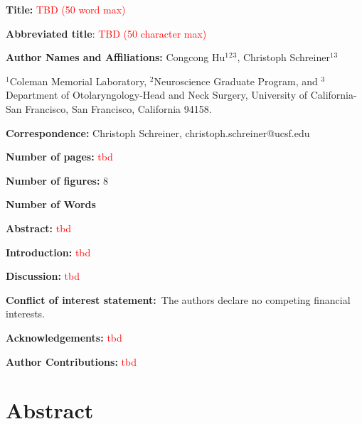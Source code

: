 \documentclass[11pt]{article}
\begin{document}
\begingroup
\let\center\flushleft
\let\endcenter\endflushleft
\endgroup

\doublespacing

\sloppy

\textbf{Title:} \textcolor{red}{TBD (50 word max)}

\textbf{Abbreviated title}: \textcolor{red}{TBD (50 character max)}

\textbf{Author Names and Affiliations:} Congcong Hu\(^1\)\(^2\)\(^3\), Christoph Schreiner\(^1\)\(^3\)

\(^1\)Coleman Memorial Laboratory, \(^2\)Neuroscience Graduate Program, and \(^3\)Department of Otolaryngology-Head and Neck Surgery, University of California-San Francisco, San Francisco, California 94158.

\textbf{Correspondence:} Christoph Schreiner, christoph.schreiner@ucsf.edu

\textbf{Number of pages:} \textcolor{red}{tbd}

\textbf{Number of figures:} 8

\textbf{Number of Words}

\textbf{Abstract:} \textcolor{red}{tbd}

\textbf{Introduction:} \textcolor{red}{tbd}

\textbf{Discussion:} \textcolor{red}{tbd}

\textbf{Conflict of interest statement:}~The authors declare no competing financial interests.

\textbf{Acknowledgements:} \textcolor{red}{tbd}
\begin{comment}
identify all funding sources and may also be used to note intellectual, technical, or other assistance that does not warrant authorship.
\end{comment}

\textbf{Author Contributions:} \textcolor{red}{tbd}



\newpage

\section*{Abstract}
\begin{comment}
(250 Words Maximum)
It should provide a concise summary of the objectives, methodology (including the species studied and whether one or both sexes were included), key results, and major conclusions of the study. It should be written in complete sentences, without subheadings.
\end{comment}
\end{document}
